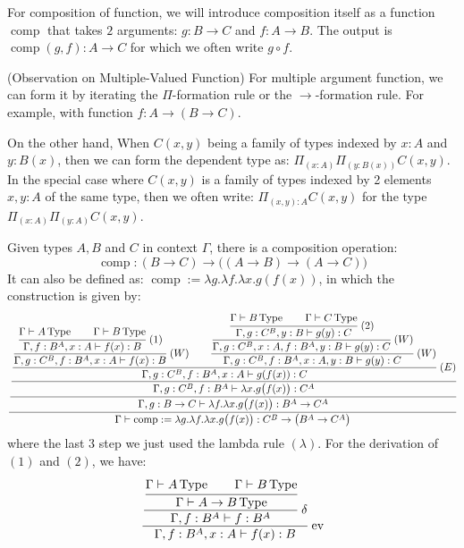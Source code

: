 For composition of function, we will introduce composition itself as a function $\operatorname{comp}$ that takes $2$ arguments: $g:B\rightarrow C$ and $f:A\rightarrow B$. The output is  $\operatorname{comp}(g,f):A\rightarrow C$ for which we often write $g\circ f$. 

\begin{remark}{(Observation on Multiple-Valued Function)}
    For multiple argument function, we can form it by  iterating the $\Pi$-formation rule or the $\rightarrow$-formation rule. For example, with function $f:A\rightarrow(B\rightarrow C)$. 
    
    On the other hand, When $C(x,y)$ being a family of types indexed by $x:A$ and $y:B(x)$, then we can form the dependent type as: $\Pi_{(x:A)}\Pi_{(y:B(x))}C(x,y)$. In the special case where $C(x,y)$ is a family of types indexed by 2 elements $x,y:A$ of the same type, then we often write: $\Pi_{(x,y):A}C(x,y)$ for the type $\Pi_{(x:A)}\Pi_{(y:A)}C(x,y)$.
\end{remark}

\begin{definition}
    Given types $A,B$ and $C$ in context $\Gamma$, there is a composition operation:
    \begin{equation*}
        \operatorname{comp}:(B\rightarrow C)\rightarrow\big( (A\rightarrow B)\rightarrow (A\rightarrow C) \big)
    \end{equation*}
    It can also be defined as: $\operatorname{comp} := \lambda g.\lambda f.\lambda x.g(f(x))$, in which the construction is given by:
    \begin{equation*}
        \cfrac{\cfrac{\cfrac{\cfrac{\cfrac{\cfrac{\Gamma\vdash A\type\qquad\Gamma\vdash B\type}{\Gamma,f:B^A,x:A\vdash f(x):B} \ (1)}{\Gamma, g:C^B,f:B^A,x:A\vdash f(x):B} \ (W) \qquad \cfrac{\cfrac{\cfrac{\Gamma\vdash B\type\qquad\Gamma\vdash C\type}{\Gamma,g:C^B, y:B\vdash g(y):C} \ (2)}{\Gamma,g:C^B,x:A, f:B^A, y:B\vdash g(y):C}\ (W)}{\Gamma,g:C^B,f:B^A, x:A, y:B\vdash g(y):C}\ (W)}{\Gamma,g:C^B,f:B^A, x:A\vdash g(f(x)):C} \ (E)}{\Gamma, g:C^B, f:B^A\vdash\lambda x.g\big(f(x)\big):C^A}}{\Gamma, g:B\to C\vdash\lambda f.\lambda x.g\big(f(x)\big):B^A\to C^A}}{\Gamma\vdash\operatorname{comp}:=\lambda g.\lambda f.\lambda x.g\big(f(x)\big):C^B\rightarrow\big(B^A\rightarrow C^A\big)}
    \end{equation*}
    where the last 3 step we just used the lambda rule $(\lambda)$. For the derivation of $(1)$ and $(2)$, we have:
    \begin{equation*}
        \cfrac{\cfrac{\cfrac{\Gamma\vdash A\type\qquad\Gamma\vdash B\type}{\Gamma\vdash A\to B\type}}{\Gamma, f:B^A\vdash f:B^A}\ \delta}{\Gamma, f:B^A, x:A \vdash f(x):B} \ \text{ev}
    \end{equation*}
\end{definition}

